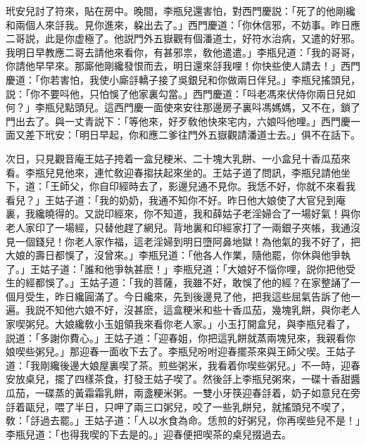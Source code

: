 玳安兒討了符來，貼在房中。晚間，李瓶兒還害怕，對西門慶説：「死了的他剛纔和兩個人來㧱我。見你進來，躱出去了。」西門慶道：「你休信邪，不妨事。昨日應二哥説，此是你虚極了。他説門外五嶽觀有個潘道士，好符水治病，又遣的好邪。我明日早教應二哥去請他來看你，有甚邪祟，敎他遣遣。」李瓶兒道：「我的哥哥，你請他早早來。那廝他剛纔發恨而去，明日還來㧱我哩！你快些使人請去！」西門慶道：「你若害怕，我使小廝㧱轎子接了吳銀兒和你做兩日伴兒。」李瓶兒搖頭兒，説：「你不要呌他，只怕悞了他家裏勾當。」西門慶道：「呌老馮來伏侍你兩日兒如何？」李瓶兒點頭兒。這西門慶一面使來安往那邊房子裏呌馮媽媽，又不在，鎖了門出去了。與一丈青説下：「等他來，好歹敎他快來宅内，六娘呌他哩。」西門慶一面又差下玳安：「明日早起，你和應二爹往門外五嶽觀請潘道士去。」俱不在話下。

次日，只見觀音庵王姑子挎着一盒兒粳米、二十塊大乳餅、一小盒兒十香瓜茄來看。李瓶兒見他來，連忙敎迎春搊扶起來坐的。王姑子道了問訊，李瓶兒請他坐下，道：「王師父，你自印經時去了，影邊兒通不見你。我恁不好，你就不來看我看兒？」王姑子道：「我的奶奶，我通不知你不好。昨日他大娘使了大官兒到庵裏，我纔曉得的。又説印經來，你不知道，我和薛姑子老淫婦合了一場好氣！與你老人家印了一場經，只替他趕了網兒。背地裏和印經家打了一兩銀子夾帳，我通沒見一個錢兒！你老人家作福，這老淫婦到明日墮阿鼻地獄！為他氣的我不好了，把大娘的壽日都悞了，沒曾來。」李瓶兒道：「他各人作業，隨他罷，你休與他爭執了。」王姑子道：「誰和他爭執甚麽！」李瓶兒道：「大娘好不惱你哩，説你把他受生的經都悞了。」王姑子道：「我的菩薩，我雖不好，敢悞了他的經？在家整誦了一個月受生，昨日纔圓滿了。今日纔來，先到後邊見了他，把我這些屈氣告訴了他一遍。我説不知他六娘不好，沒甚麽，這盒粳米和些十香瓜茄，幾塊乳餅，與你老人家喫粥兒。大娘纔敎小玉姐領我來看你老人家。」小玉打開盒兒，與李瓶兒看了，説道：「多謝你費心。」王姑子道：「迎春姐，你把這乳餅就蒸兩塊兒來，我親看你娘喫些粥兒。」那迎春一面收下去了。李瓶兒吩咐迎春擺茶來與王師父喫。王姑子道：「我剛纔後邊大娘屋裏喫了茶。煎些粥米，我看着你喫些粥兒。」不一時，迎春安放桌兒，擺了四樣茶食，打發王姑子喫了。然後㧱上李瓶兒粥來，一碟十香甜醬瓜茄，一碟蒸的黃霜霜乳餅，兩盞粳米粥。一雙小牙筷迎春㧱着，奶子如意兒在旁㧱着甌兒，喂了半日，只呷了兩三口粥兒，咬了一些乳餅兒，就搖頭兒不喫了，敎：「㧱過去罷。」王姑子道：「人以水食為命。恁煎的好粥兒，你再喫些兒不是！」李瓶兒道：「也得我喫的下去是的。」迎春便把喫茶的桌兒掇過去。

